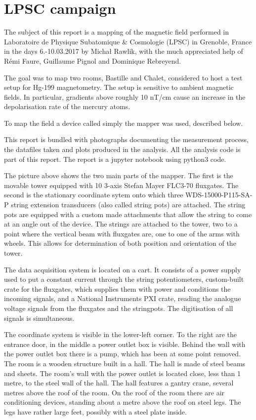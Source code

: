 \section{LPSC campaign}
The subject of this report is a mapping of the magnetic field performed in Laboratoire de Physique Subatomique \& Cosmologie (LPSC) in Grenoble, France in the days 6.-10.03.2017 by Michał Rawlik, with the much appreciated help of Rémi Faure, Guillaume Pignol and Dominique Rebreyend.

The goal was to map two rooms, Bastille and Chalet, considered to host a test setup for Hg-199 magnetometry. The setup is sensitive to ambient magnetic fields. In particular, gradients above roughly 10 nT/cm cause an increase in the depolarisation rate of the mercury atoms.

To map the field a device called simply the mapper was used, described below.

This report is bundled with photographs documenting the measurement process, the datafiles taken and plots produced in the analysis. All the analysis code is part of this report. The report is a jupyter notebook using python3 code.

The picture above shows the two main parts of the mapper. The first is the movable tower equipped with 10 3-axis Stefan Mayer FLC3-70 fluxgates. The second is the stationary coordinate sytem onto which three WDS-15000-P115-SA-P string extension transducers (also called string pots) are attached. The string pots are equipped with a custom made attachments that allow the string to come at an angle out of the device. The strings are attached to the tower, two to a point where the vertical beam with fluxgates are, one to one of the arms with wheels. This allows for determination of both position and orientation of the tower.

The data acquisition system is located on a cart. It consists of a power supply used to put a constant current through the string potentiometers, custom-built crate for the fluxgates, which supplies them with power and conditions the incoming signals, and a National Instruments PXI crate, reading the analogue voltage signals from the fluxgates and the stringpots. The digitisation of all signals is simultaneous.

The coordinate system is visible in the lower-left corner. To the right are the entrance door, in the middle a power outlet box is visible. Behind the wall with the power outlet box there is a pump, which has been at some point removed. The room is a wooden structure built in a hall. The hall is made of steel beams and sheets. The room's wall with the power outlet is located close, less than 1 metre, to the steel wall of the hall. The hall features a gantry crane, several metres above the roof of the room. On the roof of the room there are air conditioning devices, standing about a metre above the roof on steel legs. The legs have rather large feet, possibly with a steel plate inside.

